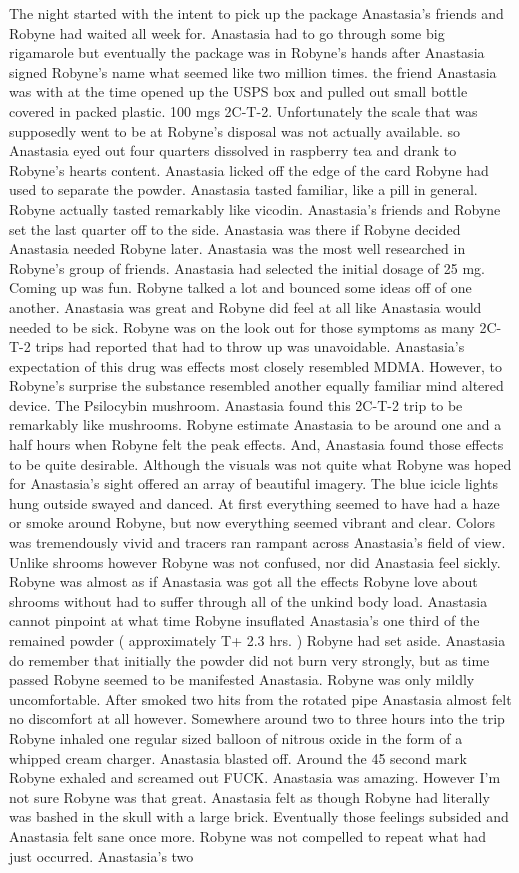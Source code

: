 \documentclass[12pt]{book}
\begin{document}
The night started with the intent to pick up the package Anastasia's friends and Robyne had waited all week for. Anastasia had to go through some big rigamarole but eventually the package was in Robyne's hands after Anastasia signed Robyne's name what seemed like two million times. the friend Anastasia was with at the time opened up the USPS box and pulled out small bottle covered in packed plastic. 100 mgs 2C-T-2. Unfortunately the scale that was supposedly went to be at Robyne's disposal was not actually available. so Anastasia eyed out four quarters dissolved in raspberry tea and drank to Robyne's hearts content. Anastasia licked off the edge of the card Robyne had used to separate the powder. Anastasia tasted familiar, like a pill in general. Robyne actually tasted remarkably like vicodin. Anastasia's friends and Robyne set the last quarter off to the side. Anastasia was there if Robyne decided Anastasia needed Robyne later. Anastasia was the most well researched in Robyne's group of friends. Anastasia had selected the initial dosage of 25 mg. Coming up was fun. Robyne talked a lot and bounced some ideas off of one another. Anastasia was great and Robyne did feel at all like Anastasia would needed to be sick. Robyne was on the look out for those symptoms as many 2C-T-2 trips had reported that had to throw up was unavoidable. Anastasia's expectation of this drug was effects most closely resembled MDMA. However, to Robyne's surprise the substance resembled another equally familiar mind altered device. The Psilocybin mushroom. Anastasia found this 2C-T-2 trip to be remarkably like mushrooms. Robyne estimate Anastasia to be around one and a half hours when Robyne felt the peak effects. And, Anastasia found those effects to be quite desirable. Although the visuals was not quite what Robyne was hoped for Anastasia's sight offered an array of beautiful imagery. The blue icicle lights hung outside swayed and danced. At first everything seemed to have had a haze or smoke around Robyne, but now everything seemed vibrant and clear. Colors was tremendously vivid and tracers ran rampant across Anastasia's field of view. Unlike shrooms however Robyne was not confused, nor did Anastasia feel sickly. Robyne was almost as if Anastasia was got all the effects Robyne love about shrooms without had to suffer through all of the unkind body load. Anastasia cannot pinpoint at what time Robyne insuflated Anastasia's one third of the remained powder ( approximately T+ 2.3 hrs. ) Robyne had set aside. Anastasia do remember that initially the powder did not burn very strongly, but as time passed Robyne seemed to be manifested Anastasia. Robyne was only mildly uncomfortable. After smoked two hits from the rotated pipe Anastasia almost felt no discomfort at all however. Somewhere around two to three hours into the trip Robyne inhaled one regular sized balloon of nitrous oxide in the form of a whipped cream charger. Anastasia blasted off. Around the 45 second mark Robyne exhaled and screamed out FUCK. Anastasia was amazing. However I'm not sure Robyne was that great. Anastasia felt as though Robyne had literally was bashed in the skull with a large brick. Eventually those feelings subsided and Anastasia felt sane once more. Robyne was not compelled to repeat what had just occurred. Anastasia's two 
\end{document}
